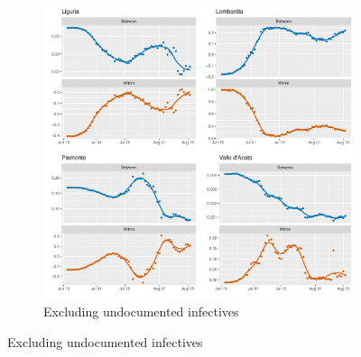 \documentclass[12pt]{article}
\begin{document}
    \begin{figure}[H]
	    \centering
	    \begin{subfigure}{\textwidth}
	      \centering
	      \includegraphics[width=0.94\linewidth]{output/model_between_lag14_betas_Nord-Ovest_rolling.pdf}
	      \caption{Excluding undocumented infectives}
	      \label{fig:beta_between_over_time_nordovest_regular}
	    \end{subfigure}
    \end{figure}
\end{document}
